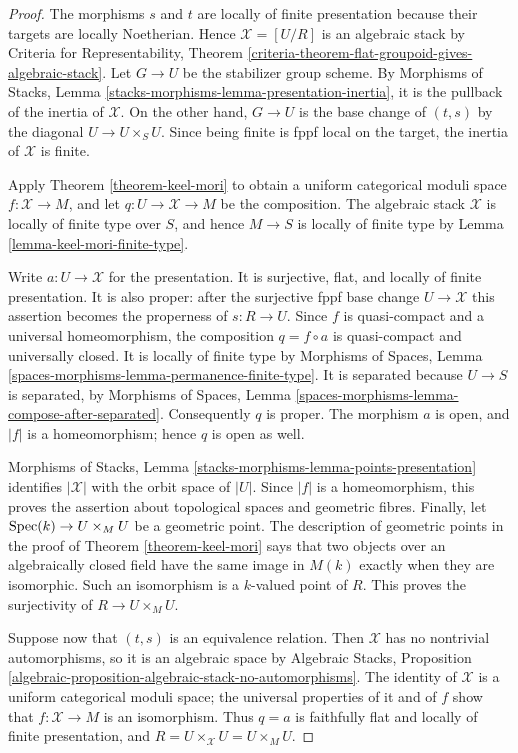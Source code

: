 \begin{proof}
The morphisms $s$ and $t$ are locally of finite presentation because
their targets are locally Noetherian. Hence
$\mathcal{X} = [U/R]$ is an algebraic stack by Criteria for
Representability, Theorem
\ref{criteria-theorem-flat-groupoid-gives-algebraic-stack}.
Let $G \to U$ be the stabilizer group scheme. By Morphisms of Stacks,
Lemma \ref{stacks-morphisms-lemma-presentation-inertia}, it is the
pullback of the inertia of $\mathcal{X}$. On the other hand,
$G \to U$ is the base change of $(t, s)$ by the diagonal
$U \to U \times_S U$. Since being finite is fppf local on the target,
the inertia of $\mathcal{X}$ is finite.

Apply Theorem \ref{theorem-keel-mori} to obtain a uniform categorical
moduli space $f : \mathcal{X} \to M$, and let
$q : U \to \mathcal{X} \to M$ be the composition. The algebraic stack
$\mathcal{X}$ is locally of finite type over $S$, and hence
$M \to S$ is locally of finite type by
Lemma \ref{lemma-keel-mori-finite-type}.

Write $a : U \to \mathcal{X}$ for the presentation. It is surjective,
flat, and locally of finite presentation. It is also proper: after the
surjective fppf base change $U \to \mathcal{X}$ this assertion becomes
the properness of $s : R \to U$. Since $f$ is quasi-compact and a
universal homeomorphism, the composition $q = f \circ a$ is
quasi-compact and universally closed. It is locally of finite type by
Morphisms of Spaces, Lemma
\ref{spaces-morphisms-lemma-permanence-finite-type}. It is separated
because $U \to S$ is separated, by Morphisms of Spaces, Lemma
\ref{spaces-morphisms-lemma-compose-after-separated}. Consequently
$q$ is proper. The morphism $a$ is open, and $|f|$ is a homeomorphism;
hence $q$ is open as well.

Morphisms of Stacks, Lemma
\ref{stacks-morphisms-lemma-points-presentation} identifies
$|\mathcal{X}|$ with the orbit space of $|U|$. Since $|f|$ is a
homeomorphism, this proves the assertion about topological spaces and
geometric fibres. Finally, let $\mathop{\mathrm{Spec}}(k) \to U \times_M U$ be a
geometric point. The description of geometric points in the proof of
Theorem \ref{theorem-keel-mori} says that two objects over an
algebraically closed field have the same image in $M(k)$ exactly when
they are isomorphic. Such an isomorphism is a $k$-valued point of $R$.
This proves the surjectivity of $R \to U \times_M U$.

Suppose now that $(t, s)$ is an equivalence relation. Then
$\mathcal{X}$ has no nontrivial automorphisms, so it is an algebraic
space by Algebraic Stacks, Proposition
\ref{algebraic-proposition-algebraic-stack-no-automorphisms}.
The identity of $\mathcal{X}$ is a uniform categorical moduli space;
the universal properties of it and of $f$ show that
$f : \mathcal{X} \to M$ is an isomorphism. Thus $q=a$ is faithfully
flat and locally of finite presentation, and
$R = U \times_{\mathcal{X}} U = U \times_M U$.
\end{proof}

